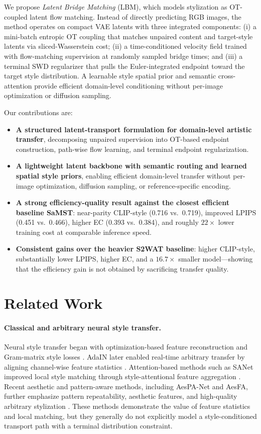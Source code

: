 ﻿\documentclass[letterpaper]{article}
\begin{document}
We propose \emph{Latent Bridge Matching} (LBM), which models stylization as OT-coupled latent flow matching. Instead of directly predicting RGB images, the method operates on compact VAE latents with three integrated components: (i) a mini-batch entropic OT coupling that matches unpaired content and target-style latents via sliced-Wasserstein cost; (ii) a time-conditioned velocity field trained with flow-matching supervision at randomly sampled bridge times; and (iii) a terminal SWD regularizer that pulls the Euler-integrated endpoint toward the target style distribution. A learnable style spatial prior and semantic cross-attention provide efficient domain-level conditioning without per-image optimization or diffusion sampling.

Our contributions are:
\begin{itemize}
    \item \textbf{A structured latent-transport formulation for domain-level artistic transfer}, decomposing unpaired supervision into OT-based endpoint construction, path-wise flow learning, and terminal endpoint regularization.
    \item \textbf{A lightweight latent backbone with semantic routing and learned spatial style priors}, enabling efficient domain-level transfer without per-image optimization, diffusion sampling, or reference-specific encoding.
    \item \textbf{A strong efficiency-quality result against the closest efficient baseline SaMST}: near-parity CLIP-style (0.716 vs.\ 0.719), improved LPIPS (0.451 vs.\ 0.466), higher EC (0.393 vs.\ 0.384), and roughly $22\times$ lower training cost at comparable inference speed.
    \item \textbf{Consistent gains over the heavier S2WAT baseline}: higher CLIP-style, substantially lower LPIPS, higher EC, and a $16.7\times$ smaller model---showing that the efficiency gain is not obtained by sacrificing transfer quality.
\end{itemize}

\section{Related Work}
\paragraph{Classical and arbitrary neural style transfer.}
Neural style transfer began with optimization-based feature reconstruction and Gram-matrix style losses \cite{gatys2016image}. AdaIN later enabled real-time arbitrary transfer by aligning channel-wise feature statistics \cite{huang2017adain}. Attention-based methods such as SANet improved local style matching through style-attentional feature aggregation \cite{park2019sanet}. Recent aesthetic and pattern-aware methods, including AesPA-Net and AesFA, further emphasize pattern repeatability, aesthetic features, and high-quality arbitrary stylization \cite{hong2023aespa,huang2024aesfa}. These methods demonstrate the value of feature statistics and local matching, but they generally do not explicitly model a style-conditioned transport path with a terminal distribution constraint.
\end{document}
